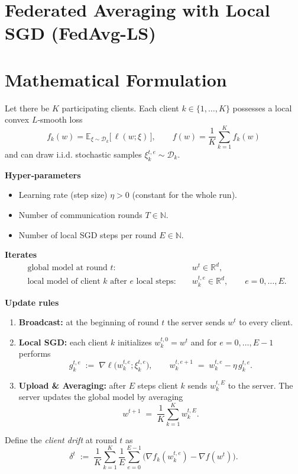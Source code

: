 \documentclass{article}
\newcommand{\E}{\mathbb{E}}
\newcommand{\R}{\mathbb{R}}
\begin{document}
\section*{Federated Averaging with Local SGD (FedAvg-LS)}

\section*{Mathematical Formulation}
Let there be $K$ participating clients.  
Each client $k\in\{1,\dots,K\}$ possesses a local convex $L$‑smooth loss 
\[
f_k(w)=\E_{\xi\sim\mathcal{D}_k}\bigl[\,\ell(w;\xi)\,\bigr],\qquad 
f(w)=\frac1K\sum_{k=1}^{K}f_k(w)
\]
and can draw i.i.d. stochastic samples $\xi_{k}^{t,e}\sim\mathcal{D}_k$.

\medskip
\noindent\textbf{Hyper‑parameters}
\begin{itemize}[leftmargin=*, nosep]
  \item Learning rate (step size) $\eta>0$ (constant for the whole run).
  \item Number of communication rounds $T\in\mathbb{N}$.
  \item Number of local SGD steps per round $E\in\mathbb{N}$.
\end{itemize}

\medskip
\noindent\textbf{Iterates}
\[
\begin{aligned}
&\text{global model at round }t: && w^{t}\in\R^{d},\\
&\text{local model of client }k \text{ after }e\text{ local steps: } 
&& w_{k}^{t,e}\in\R^{d},\qquad e=0,\dots,E .
\end{aligned}
\]

\medskip
\noindent\textbf{Update rules}
\begin{enumerate}
  \item \textbf{Broadcast:} at the beginning of round $t$ the server sends $w^{t}$ to every client.
  \item \textbf{Local SGD:} each client $k$ initializes $w_{k}^{t,0}=w^{t}$ and for $e=0,\dots,E-1$ performs
  \[
  g_{k}^{t,e}\;:=\;\nabla \ell\bigl(w_{k}^{t,e};\xi_{k}^{t,e}\bigr),\qquad
  w_{k}^{t,e+1}\;=\;w_{k}^{t,e}-\eta\,g_{k}^{t,e}.   \tag{1}
  \]
  \item \textbf{Upload \& Averaging:} after $E$ steps client $k$ sends $w_{k}^{t,E}$ to the server.
  The server updates the global model by averaging
  \[
  w^{t+1}\;=\;\frac1K\sum_{k=1}^{K}w_{k}^{t,E}.   \tag{2}
  \]
\end{enumerate}
Define the \emph{client drift} at round $t$ as
\[
\delta^{t}\;:=\;\frac1K\sum_{k=1}^{K}\frac1E\sum_{e=0}^{E-1}
\bigl(\nabla f_k(w_{k}^{t,e})-\nabla f(w^{t})\bigr). \tag{3}
\]
\end{document}
